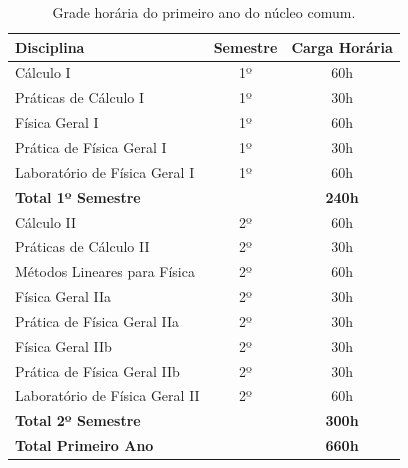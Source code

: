 \documentclass[a4paper, 12pt]{article}
\begin{document}
\begin{table}[h]
    \centering
    \begin{tabular}{|l|c|c|}
        \hline
        \textbf{Disciplina}            & \textbf{Semestre} & \textbf{Carga Horária} \\
        \hline
        Cálculo I                      & 1º                & 60h                    \\
        Práticas de Cálculo I          & 1º                & 30h                    \\
        Física Geral I                 & 1º                & 60h                    \\
        Prática de Física Geral I      & 1º                & 30h                    \\
        Laboratório de Física Geral I  & 1º                & 60h                    \\
        \hline
        \textbf{Total 1º Semestre}     &                   & \textbf{240h}          \\
        \hline
        \hline
        Cálculo II                     & 2º                & 60h                    \\
        Práticas de Cálculo II         & 2º                & 30h                    \\
        Métodos Lineares para Física   & 2º                & 60h                    \\
        Física Geral IIa               & 2º                & 30h                    \\
        Prática de Física Geral IIa    & 2º                & 30h                    \\
        Física Geral IIb               & 2º                & 30h                    \\
        Prática de Física Geral IIb    & 2º                & 30h                    \\
        Laboratório de Física Geral II & 2º                & 60h                    \\
        \hline
        \textbf{Total 2º Semestre}     &                   & \textbf{300h}          \\
        \hline
        \textbf{Total Primeiro Ano}    &                   & \textbf{660h}          \\
        \hline
    \end{tabular}
    \caption{Grade horária do primeiro ano do núcleo comum.}
\end{table}
\end{document}
